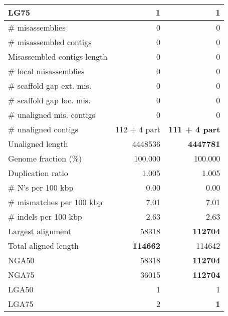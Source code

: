 \documentclass[12pt,a4paper]{article}
\begin{document}
\begin{table}[ht]
\begin{center}
\begin{tabular}{|l*{2}{|r}|}
LG75 & 1 & 1 \\ \hline
\# misassemblies & 0 & 0 \\ \hline
\# misassembled contigs & 0 & 0 \\ \hline
Misassembled contigs length & 0 & 0 \\ \hline
\# local misassemblies & 0 & 0 \\ \hline
\# scaffold gap ext. mis. & 0 & 0 \\ \hline
\# scaffold gap loc. mis. & 0 & 0 \\ \hline
\# unaligned mis. contigs & 0 & 0 \\ \hline
\# unaligned contigs & 112 + 4 part & {\bf 111 + 4 part} \\ \hline
Unaligned length & 4448536 & {\bf 4447781} \\ \hline
Genome fraction (\%) & 100.000 & 100.000 \\ \hline
Duplication ratio & 1.005 & 1.005 \\ \hline
\# N's per 100 kbp & 0.00 & 0.00 \\ \hline
\# mismatches per 100 kbp & 7.01 & 7.01 \\ \hline
\# indels per 100 kbp & 2.63 & 2.63 \\ \hline
Largest alignment & 58318 & {\bf 112704} \\ \hline
Total aligned length & {\bf 114662} & 114642 \\ \hline
NGA50 & 58318 & {\bf 112704} \\ \hline
NGA75 & 36015 & {\bf 112704} \\ \hline
LGA50 & 1 & 1 \\ \hline
LGA75 & 2 & {\bf 1} \\ \hline
\end{tabular}
\end{center}
\end{table}
\end{document}
